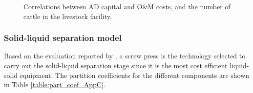 \begin{refsection}[referencesCh4]
\begin{figure}[h!]
	\caption{Correlations between AD capital and O\&M costs, and the number of cattle in the livestock facility.}
	\label{fig:AD_size_2cost_AppC}
\end{figure}

\subsubsection{Solid-liquid separation model}
Based on the evaluation reported by \citet{MollerSLsep}, a screw press is the technology selected to carry out the solid-liquid separation stage since it is the most cost efficient liquid-solid equipment. The partition coefficients for the different components are shown in Table \ref{table:part_coef_AppC}.
\begin{table}[h] 
		\centering
		\caption{Partition coefficients for solid-liquid manure separation using a screw press unit \protect\citep{MollerSLsep}.} \label{table:part_coef_AppC}
\end{table}


\end{refsection}
